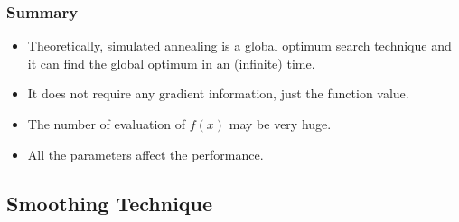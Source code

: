 \documentclass[hyperref={pdfpagelabels=false}]{beamer}
\begin{document}

\begin{frame}
\frametitle{Summary}
\begin{itemize}
\item Theoretically, simulated annealing is a global optimum search technique and it can find the global optimum in an (infinite) time. 
\item It does not require any gradient information, just the function value.
\item The number of evaluation of $f(x)$ may be very huge.
\item All the parameters affect the performance.
\end{itemize}
\end{frame}

\subsection{Smoothing Technique} 
\end{document}
